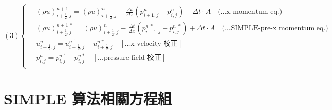 \documentclass[12pt]{article}
\begin{document}
\begin{equation}
(3)
\left\{
\begin{aligned}
    \ &(\rho u)_{i+\frac{1}{2},j}^{n+1} = (\rho u)_{i+\frac{1}{2},j}^{n} - \frac{\Delta t}{\Delta x}(p_{i+1,j}^{n} - p_{i,j}^{n}) + \Delta t \cdot A  \quad \text{(...x momentum eq.)}\\[1.5ex]
    \ &(\rho u)_{i+\frac{1}{2},j}^{n+1\ *} = (\rho u)_{i+\frac{1}{2},j}^{n} - \frac{\Delta t}{\Delta x}(p_{i+1,j}^{n\ *} - p_{i,j}^{n\ *}) + \Delta t \cdot A \quad \text{(...SIMPLE-pre-x momentum eq.)}\\[1.5ex]
    \ &u_{i+\frac{1}{2},j}^{n} = u_{i+\frac{1}{2},j}^{n\ '} + u_{i+\frac{1}{2},j}^{n *}  \quad \left[\text{...x-velocity 校正}\right]\\[1.5ex]
    \ &p_{i,j}^{n} = p_{i,j}^{n\ '} + p_{i,j}^{n *} \quad\left[\text{...pressure field 校正}\right]\\[1.5ex]
\end{aligned}
\right.
\end{equation}
\newpage


\section{SIMPLE 算法相關方程組}
\label{SIMPLE equations}
\end{document}
